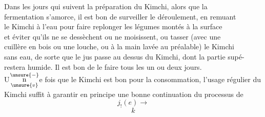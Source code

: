 Dans les jours qui suivent la préparation du Kimchi, alors que la\\
fermentation s'amorce, il est bon de surveiller le déroulement, en remuant\\
le Kimchi à l'eau pour faire replonger les légumes montés à la surface\\
et éviter qu'ils ne se dessèchent ou ne moisissent, ou tasser (avec une\\
cuillère en bois ou une louche, ou à la main lavée au préalable) le Kimchi\\
sans eau, de sorte que le jus passe au dessus du Kimchi, dont la partie supé-\\
 restera humide. Il est bon de le faire tous les un ou deux jours.\\
U$\underset{\unsure{v}}{\overset{\unsure{-}}{\mathrm n}}$e fois que le Kimchi est bon pour la consommation, l'usage régulier du\\
Kimchi suffit à garantir en principe une bonne continuation du processus de
\[
j_!(e)\longrightarrow
\]
\[
k
\]

